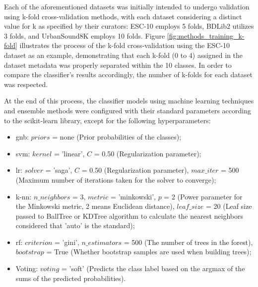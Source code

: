 Each of the aforementioned datasets was initially intended to undergo validation using k-fold cross-validation methods, with each dataset considering a distinct value for k as specified by their curators: ESC-10 employs 5 folds, BDLib2 utilizes 3 folds, and UrbanSound8K employs 10 folds. Figure \ref{fig:methods_training_k-fold} illustrates the process of the k-fold cross-validation using the ESC-10 dataset as an example, demonstrating that each k-fold (0 to 4) assigned in the dataset metadata was properly separated within the 10 classes. In order to compare the classifier's results accordingly, the number of k-folds for each dataset was respected.

At the end of this process, the classifier models using machine learning techniques and ensemble methods were configured with their standard parameters according to the scikit-learn library, except for the following hyperparameters:

\begin{itemize}
    \item \gls{gnb}: $ priors$ = none (Prior probabilities of the classes);
    \item \gls{svm}: $kernel$ = 'linear', $C$ = 0.50 (Regularization parameter);
    \item \gls{lr}: $solver$ = 'saga', $C$ = 0.50 (Regularization parameter), $max\_iter$ = 500 (Maximum number of iterations taken for the solver to converge);
    \item \gls{k-nn}: $n\_neighbors$ = 3, $metric$ = 'minkowski', $p$ = 2 (Power parameter for the Minkowski metric, 2 means Euclidean distance), $leaf\_size$ = 20 (Leaf size passed to BallTree or KDTree algorithm to calculate the nearest neighbors considered that 'auto' is the standard);
    \item \gls{rf}: $criterion$ = 'gini', $n\_estimators$ = 500 (The number of trees in the forest), $bootstrap$ = True (Whether bootstrap samples are used when building trees);
    \item Voting: $voting$ = 'soft' (Predicts the class label based on the argmax of the sums of the predicted probabilities).
\end{itemize}

